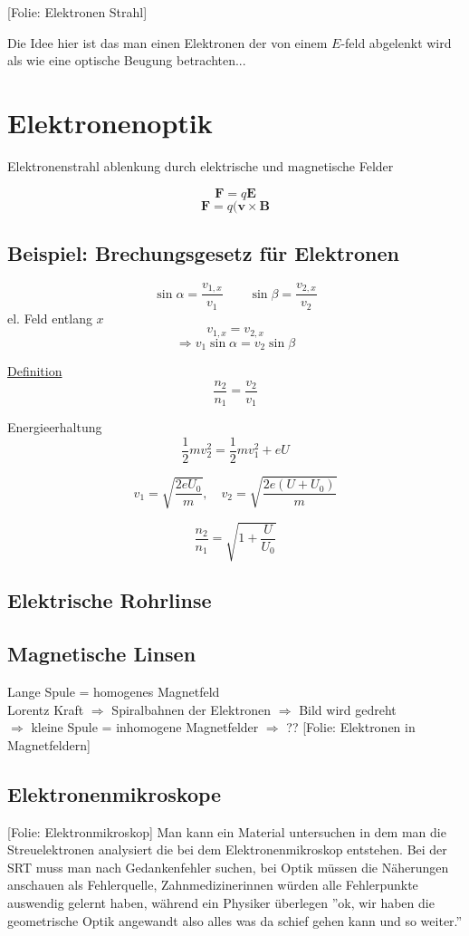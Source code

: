 \documentclass[titlepage,11pt,a4paper,ngerman]{report}
\newcommand{\folie}[1]{\color{gray}[Folie: #1]\color{black}}
\renewcommand{\vec}[1]{\boldsymbol{#1}}
\newcommand{\lcom}[1]{\color{MidnightBlue}#1\color{black}}
\newcommand{\frbox}[2]{\begin{tcolorbox}[colback=white,colframe=red!75!black,fonttitle=\bfseries,title=#1]#2\end{tcolorbox}}
\begin{document}

\folie{Elektronen Strahl}

\lcom{Die Idee hier ist das man einen Elektronen der von einem $E$-feld abgelenkt wird als wie eine optische Beugung betrachten...}
\section{Elektronenoptik}

Elektronenstrahl ablenkung durch elektrische und magnetische Felder

$$\vec{F} = q \vec{E}$$
$$\vec{F} = q (\vec{v} \times \vec{B}$$
\subsection{Beispiel: Brechungsgesetz für Elektronen}

$$\sin \alpha = \frac{v_{1,x}}{v_1} \qquad \sin \beta = \frac{v_{2,x}}{v_2}$$
el. Feld entlang $x$
$$v_{1,x} = v_{2,x}$$
$$\Rightarrow v_1 \sin \alpha = v_2 \sin \beta$$

\underline{Definition}
$$\frac{n_2}{n_1} = \frac{v_2}{v_1}$$

Energieerhaltung
$$\frac{1}{2} mv^2_2 = \frac{1}{2} mv_1^2 + eU$$

$$v_1 = \sqrt{\frac{2eU_0}{m}}, \quad v_2 = \sqrt{\frac{2e(U+U_0)}{m}}$$

\frbox{$\Rightarrow$ Brechindex}{$$\frac{n_2}{n_1} = \sqrt{1 + \frac{U}{U_0}}$$}

\subsection{Elektrische Rohrlinse}
\subsection{Magnetische Linsen}

Lange Spule = homogenes Magnetfeld\\
Lorentz Kraft $\Rightarrow$ Spiralbahnen der Elektronen $\Rightarrow$ Bild wird gedreht\\
$\Rightarrow$ kleine Spule = inhomogene Magnetfelder $\Rightarrow$ ?? %
\folie{Elektronen in Magnetfeldern}
\subsection{Elektronenmikroskope}
\folie{Elektronmikroskop}
\lcom{Man kann ein Material untersuchen in dem man die Streuelektronen analysiert die bei dem Elektronenmikroskop entstehen.}
\lcom{Bei der SRT muss man nach Gedankenfehler suchen, bei Optik müssen die Näherungen anschauen als Fehlerquelle, Zahnmedizinerinnen würden alle Fehlerpunkte auswendig gelernt haben, während ein Physiker überlegen ''ok, wir haben die geometrische Optik angewandt also alles was da schief gehen kann und so weiter.''}
\end{document}
